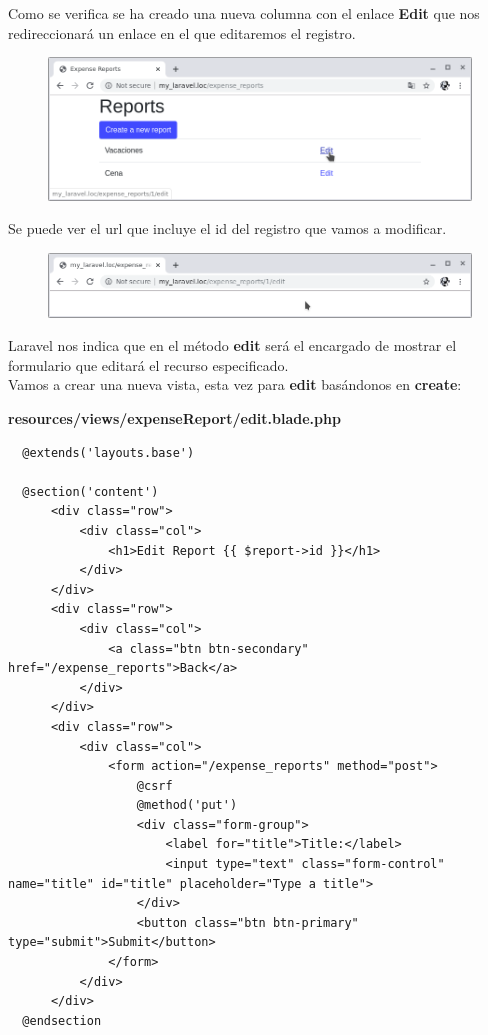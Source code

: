 \documentclass{article}
\begin{document}
Como se verifica se ha creado una nueva columna con el enlace \textbf{Edit} que
nos redireccionará un enlace en el que editaremos el registro.

\begin{figure}[h!]
  \centering
  \includegraphics[scale=0.5]{./Pictures/070_columna_edit.png}
\end{figure}

Se puede ver el url que incluye el id del registro que vamos a modificar.

\begin{figure}[h!]
  \centering
  \includegraphics[scale=0.5]{./Pictures/071_url_edit.png}
\end{figure}

Laravel nos indica que en el método \textbf{edit} será el encargado de mostrar
el formulario que editará el recurso especificado.\\

Vamos a crear una nueva vista, esta vez para \textbf{edit} basándonos en
\textbf{create}:

\textbf{resources/views/expenseReport/edit.blade.php}
\begin{verbatim}
  @extends('layouts.base')

  @section('content')
      <div class="row">
          <div class="col">
              <h1>Edit Report {{ $report->id }}</h1>
          </div>
      </div>
      <div class="row">
          <div class="col">
              <a class="btn btn-secondary" href="/expense_reports">Back</a>
          </div>
      </div>
      <div class="row">
          <div class="col">
              <form action="/expense_reports" method="post">
                  @csrf
                  @method('put')
                  <div class="form-group">
                      <label for="title">Title:</label>
                      <input type="text" class="form-control" name="title" id="title" placeholder="Type a title">
                  </div>
                  <button class="btn btn-primary" type="submit">Submit</button>
              </form>
          </div>
      </div>
  @endsection
\end{verbatim}
\end{document}
